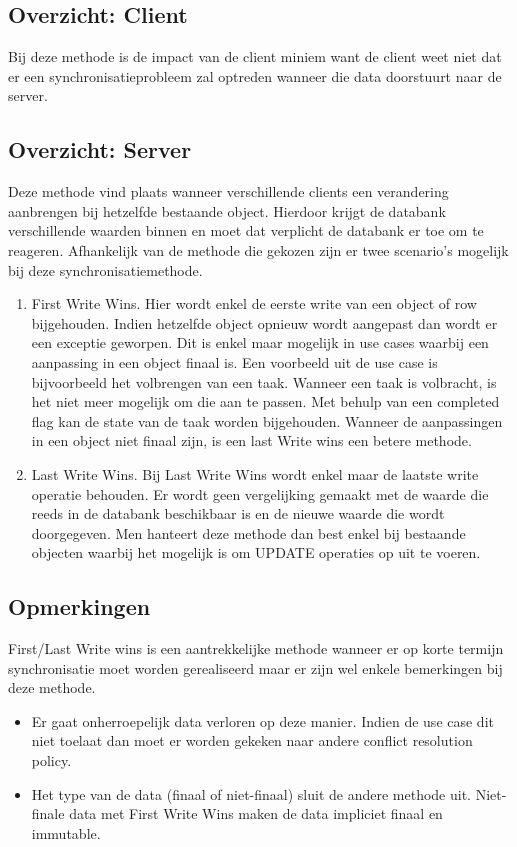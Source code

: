 \subsection{Overzicht: Client}
Bij deze methode is de impact van de client miniem want de client weet niet dat er een synchronisatieprobleem zal optreden wanneer die data doorstuurt naar de server.
\subsection{Overzicht: Server}
Deze methode vind plaats wanneer verschillende clients een verandering aanbrengen bij hetzelfde bestaande object. Hierdoor krijgt de databank verschillende waarden binnen en moet dat verplicht de databank er toe om te reageren. Afhankelijk van de methode die gekozen zijn er twee scenario's mogelijk bij deze synchronisatiemethode.
\begin{enumerate}
\item First Write Wins. Hier wordt enkel de eerste write van een object of row bijgehouden. Indien hetzelfde object opnieuw wordt aangepast dan wordt er een exceptie geworpen. Dit is enkel maar mogelijk in use cases waarbij een aanpassing in een object finaal is. Een voorbeeld uit de use case is bijvoorbeeld het volbrengen van een taak. Wanneer een taak is volbracht, is het niet meer mogelijk om die aan te passen. Met behulp van een completed flag kan de state van de taak worden bijgehouden. Wanneer de aanpassingen in een object niet finaal zijn, is een last Write wins een betere methode.
\item Last Write Wins. Bij Last Write Wins wordt enkel maar de laatste write operatie behouden. Er wordt geen vergelijking gemaakt met de waarde die reeds in de databank beschikbaar is en de nieuwe waarde die wordt doorgegeven. Men hanteert deze methode dan best enkel bij bestaande objecten waarbij het mogelijk is om UPDATE operaties op uit te voeren.
\end{enumerate}
\subsection{Opmerkingen}
First/Last Write wins is een aantrekkelijke methode wanneer er op korte termijn synchronisatie moet worden gerealiseerd maar er zijn wel enkele bemerkingen bij deze methode.
\begin{itemize}
\item Er gaat onherroepelijk data verloren op deze manier. Indien de use case dit niet toelaat dan moet er worden gekeken naar andere conflict resolution policy.
\item Het type van de data (finaal of niet-finaal) sluit de andere methode uit. Niet-finale data met First Write Wins maken de data impliciet finaal en immutable.
\end{itemize}
